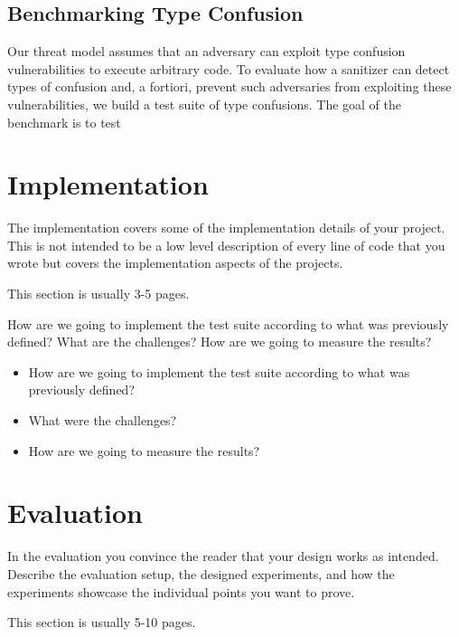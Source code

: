 \documentclass[a4paper,11pt,oneside]{report}
\begin{document}
\section{Benchmarking Type Confusion}

Our threat model assumes that an adversary can exploit type confusion vulnerabilities to execute arbitrary code. 
To evaluate how a sanitizer can detect types of confusion and, a fortiori, prevent such adversaries from exploiting these vulnerabilities, we build a test suite of type confusions. 
The goal of the benchmark is to test 




\chapter{Implementation}

The implementation covers some of the implementation details of your project.
This is not intended to be a low level description of every line of code that
you wrote but covers the implementation aspects of the projects.

This section is usually 3-5 pages.

How are we going to implement the test suite according to what was previously defined? What are the challenges? 
How are we going to measure the results?

\begin{itemize}
       \item How are we going to implement the test suite according to what was previously defined? 
       \item What were the challenges?
       \item How are we going to measure the results?
\end{itemize}


\chapter{Evaluation}

In the evaluation you convince the reader that your design works as intended.
Describe the evaluation setup, the designed experiments, and how the
experiments showcase the individual points you want to prove.

This section is usually 5-10 pages.
\end{document}
